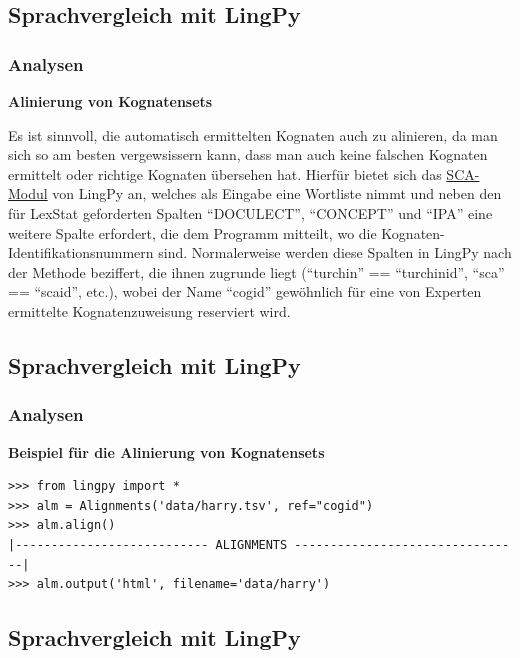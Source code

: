 \subsection{\texorpdfstring{{Sprachvergleich mit
LingPy}}{Sprachvergleich mit LingPy}}

\subsubsection{\texorpdfstring{{Analysen}}{Analysen}}

\textbf{Alinierung von Kognatensets}

Es ist sinnvoll, die automatisch ermittelten Kognaten auch zu alinieren,
da man sich so am besten vergewsissern kann, dass man auch keine
falschen Kognaten ermittelt oder richtige Kognaten übersehen hat.
Hierfür bietet sich das
\href{http://lingpy.org/reference/lingpy.align.html\#module-lingpy.align.sca}{SCA-Modul}
von LingPy an, welches als Eingabe eine Wortliste nimmt und neben den
für LexStat geforderten Spalten ``DOCULECT'', ``CONCEPT'' und ``IPA''
eine weitere Spalte erfordert, die dem Programm mitteilt, wo die
Kognaten-Identifikationsnummern sind. Normalerweise werden diese Spalten
in LingPy nach der Methode beziffert, die ihnen zugrunde liegt
(``turchin'' == ``turchinid'', ``sca'' == ``scaid'', etc.), wobei der
Name ``cogid'' gewöhnlich für eine von Experten ermittelte
Kognatenzuweisung reserviert wird.

\subsection{\texorpdfstring{{Sprachvergleich mit
LingPy}}{Sprachvergleich mit LingPy}}

\subsubsection{\texorpdfstring{{Analysen}}{Analysen}}

\textbf{Beispiel für die Alinierung von Kognatensets}

\begin{verbatim}
>>> from lingpy import *
>>> alm = Alignments('data/harry.tsv', ref="cogid")
>>> alm.align()
|--------------------------- ALIGNMENTS --------------------------------|
>>> alm.output('html', filename='data/harry')
\end{verbatim}

\subsection{\texorpdfstring{{Sprachvergleich mit
LingPy}}{Sprachvergleich mit LingPy}}

